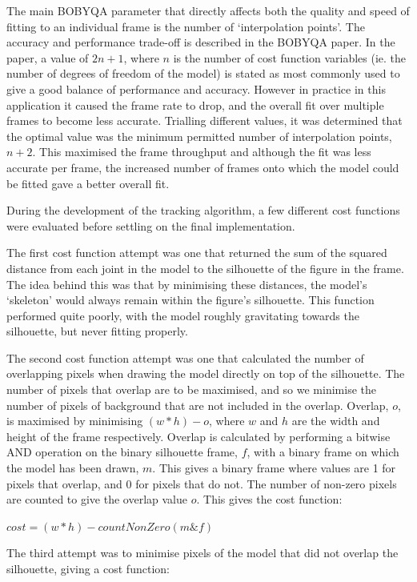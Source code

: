 The main BOBYQA parameter that directly affects both the quality and speed of fitting to an individual frame is the number of `interpolation points'. The accuracy and performance trade-off is described in the BOBYQA paper\cite{bobyqa}. In the paper, a value of $2n + 1$, where $n$ is the number of cost function variables (ie. the number of degrees of freedom of the model) is stated as most commonly used to give a good balance of performance and accuracy. However in practice in this application it caused the frame rate to drop, and the overall fit over multiple frames to become less accurate. Trialling different values, it was determined that the optimal value was the minimum permitted number of interpolation points, $n + 2$. This maximised the frame throughput and although the fit was less accurate per frame, the increased number of frames onto which the model could be fitted gave a better overall fit.

During the development of the tracking algorithm, a few different cost functions were evaluated before settling on the final implementation.

The first cost function attempt was one that returned the sum of the squared distance from each joint in the model to the silhouette of the figure in the frame. The idea behind this was that by minimising these distances, the model's `skeleton' would always remain within the figure's silhouette. This function performed quite poorly, with the model roughly gravitating towards the silhouette, but never fitting properly.

The second cost function attempt was one that calculated the number of overlapping pixels when drawing the model directly on top of the silhouette. The number of pixels that overlap are to be maximised, and so we minimise the number of pixels of background that are not included in the overlap. Overlap, $o$, is maximised by minimising $(w * h) - o$, where $w$ and $h$ are the width and height of the frame respectively. Overlap is calculated by performing a bitwise AND operation on the binary silhouette frame, $f$, with a binary frame on which the model has been drawn, $m$. This gives a binary frame where values are 1 for pixels that overlap, and 0 for pixels that do not. The number of non-zero pixels are counted to give the overlap value $o$. This gives the cost function:

\centerline{$cost = (w * h) - countNonZero(m \& f)$}

The third attempt was to minimise pixels of the model that did not overlap the silhouette, giving a cost function:

